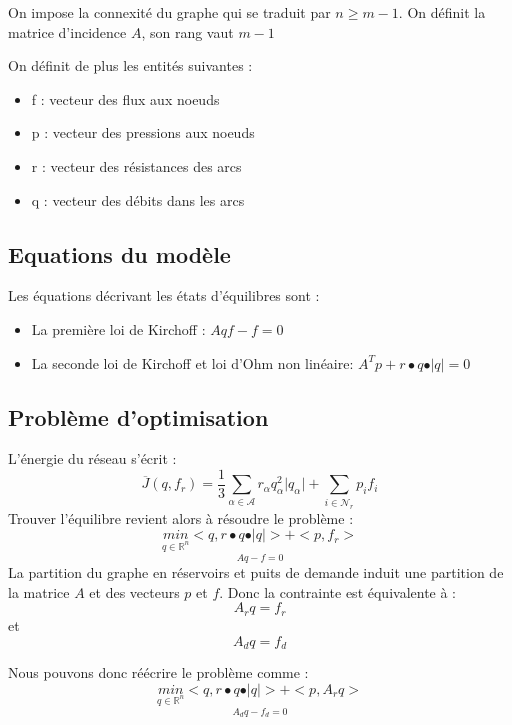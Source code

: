On impose la connexité du graphe qui se traduit par $n \geqslant m-1$. On définit la matrice d'incidence $A$, son rang vaut $m-1$

On définit de plus les entités suivantes : 
\begin{itemize}
\item f : vecteur des flux aux noeuds
\item p : vecteur des pressions aux noeuds
\item r : vecteur des résistances des arcs
\item q : vecteur des débits dans les arcs
\end{itemize}

\subsection{Equations du modèle}
Les équations décrivant les états d'équilibres sont : 
\begin{itemize}
\item La première loi de Kirchoff : $Aqf- f= 0 $
\item La seconde loi de Kirchoff  et loi d'Ohm non linéaire: $A^Tp + r\bullet q \bullet \vert q\vert =0$
\end{itemize}


\subsection{Problème d'optimisation}

L'énergie du réseau s'écrit : 
\begin{equation}
\overline{J}(q, f_r) = \frac{1}{3}\sum_{\alpha \in \mathcal{A}} r_\alpha q_\alpha^2 \vert q_\alpha \vert + \sum_{i\in \mathcal{N}_r} p_i f_i
\end{equation}
Trouver l'équilibre revient alors à résoudre le problème : 
\begin{equation}
\underset{Aq-f = 0}{\underset{q\in \mathbb{R}^{n}}{min}< q, r\bullet q\bullet \vert q\vert> + <p, f_r>}
\end{equation}
La partition du graphe en réservoirs et puits de demande induit une partition de la matrice $A$ et des vecteurs $p$ et $f$. 
Donc  la contrainte est équivalente à :
\begin{equation}
A_rq = f_r 
\end{equation}
et
\begin{equation}
A_dq = f_d 
\end{equation}

Nous pouvons donc réécrire le problème comme : 
\begin{equation}
\underset{A_dq-f_d = 0}{\underset{q\in \mathbb{R}^{n}}{min}< q, r\bullet q\bullet \vert q\vert> + <p, A_rq>}
\end{equation}


